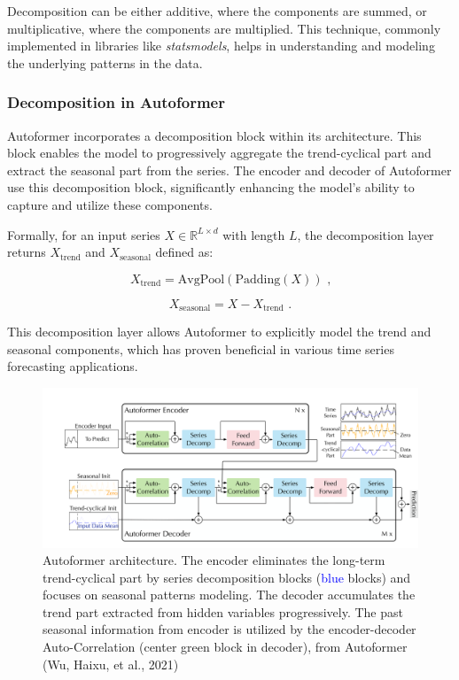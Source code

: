 Decomposition can be either additive, where the components are summed, or multiplicative, where the components are multiplied. This technique, commonly implemented in libraries like \textit{statsmodels}, helps in understanding and modeling the underlying patterns in the data.

\subsubsection{Decomposition in Autoformer}
Autoformer incorporates a decomposition block within its architecture. This block enables the model to progressively aggregate the trend-cyclical part and extract the seasonal part from the series. The encoder and decoder of Autoformer use this decomposition block, significantly enhancing the model’s ability to capture and utilize these components.

Formally, for an input series \( X \in \mathbb{R}^{L \times d} \) with length \( L \), the decomposition layer returns \( X_{\text{trend}} \) and \( X_{\text{seasonal}} \) defined as:

\begin{equation}
X_{\text{trend}} = \text{AvgPool}(\text{Padding}(X)) \text{ ,}
\end{equation}

\begin{equation}
X_{\text{seasonal}} = X - X_{\text{trend}} \text{ .}
\end{equation}

This decomposition layer allows Autoformer to explicitly model the trend and seasonal components, which has proven beneficial in various time series forecasting applications.

\begin{figure}[htbp]
    \centering
    \includegraphics[width=15cm]{3_ChapterTranformerVariants/figuras/AutoformerArchitecture.pdf}
    \caption{Autoformer architecture. The encoder eliminates the long-term trend-cyclical part by series decomposition blocks (\textcolor{blue}{blue} blocks) and focuses on seasonal patterns modeling. The decoder accumulates the trend part extracted from hidden variables progressively. The past seasonal information from encoder is utilized by the encoder-decoder Auto-Correlation (center \textcolor[rgb]{0.15,0.7,0.15}{green} block in decoder), from Autoformer (Wu, Haixu, et al., 2021)\cite{wu2022autoformerdecompositiontransformersautocorrelation}}
    \end{figure}




